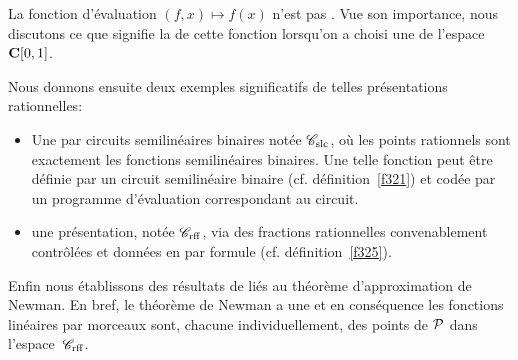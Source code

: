 La fonction d'évaluation  $(f, x) \mapsto f(x)$  n'est pas \loca \unico. Vue son importance, nous discutons ce que signifie la \com de cette fonction lorsqu'on a choisi une \rp  de l'espace  ${{\bf C}[0,1]}$. 

Nous donnons ensuite deux exemples significatifs de telles présentations 
rationnelles:
\begin{itemize}
\item Une \pres par circuits semilinéaires binaires notée  ${{{\mathscr C}}_{\rm slc}}$, où les 
points rationnels sont exactement les fonctions semilinéaires binaires. Une telle fonction peut être définie par un circuit semilinéaire binaire (cf. définition~\ref{f321}) et codée par un programme d'évaluation correspondant au circuit.
\item une présentation, notée ${{{\mathscr C}}_{\rm rff}}$, via des fractions rationnelles 
convenablement contrôlées et données en \pres par formule (cf. définition~\ref{f325}).
\end{itemize}
Enfin nous établissons des résultats de \com liés au théorème 
d'approximation de Newman. En bref, le théorème de Newman a une \com 
\polle et en conséquence les fonctions linéaires par morceaux sont, 
chacune individuellement, des points de \com ${\cal P}$  dans l'espace~${{{\mathscr C}}_{\rm rff}}$.



